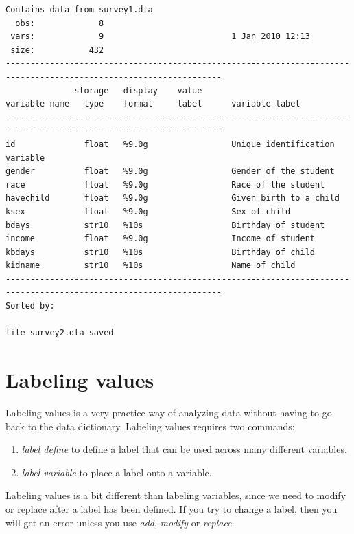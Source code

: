\documentclass[
]{book}
\providecommand{\tightlist}{%
  \setlength{\itemsep}{0pt}\setlength{\parskip}{0pt}}
\begin{document}
\begin{verbatim}
Contains data from survey1.dta
  obs:             8                          
 vars:             9                          1 Jan 2010 12:13
 size:           432                          
------------------------------------------------------------------------------------------------------------------
              storage   display    value
variable name   type    format     label      variable label
------------------------------------------------------------------------------------------------------------------
id              float   %9.0g                 Unique identification variable
gender          float   %9.0g                 Gender of the student
race            float   %9.0g                 Race of the student
havechild       float   %9.0g                 Given birth to a child
ksex            float   %9.0g                 Sex of child
bdays           str10   %10s                  Birthday of student
income          float   %9.0g                 Income of student
kbdays          str10   %10s                  Birthday of child
kidname         str10   %10s                  Name of child
------------------------------------------------------------------------------------------------------------------
Sorted by: 

file survey2.dta saved
\end{verbatim}

\section{Labeling values}\label{labeling-values}

Labeling values is a very practice way of analyzing data without having to go back to the data dictionary. Labeling values requires two commands:

\begin{enumerate}
\def\labelenumi{\arabic{enumi}.}
\tightlist
\item
  \emph{label define} to define a label that can be used across many different variables.
\item
  \emph{label variable} to place a label onto a variable.
\end{enumerate}

Labeling values is a bit different than labeling variables, since we need to modify or replace after a label has been defined. If you try to change a label, then you will get an error unless you use \emph{add}, \emph{modify} or \emph{replace}
\end{document}
